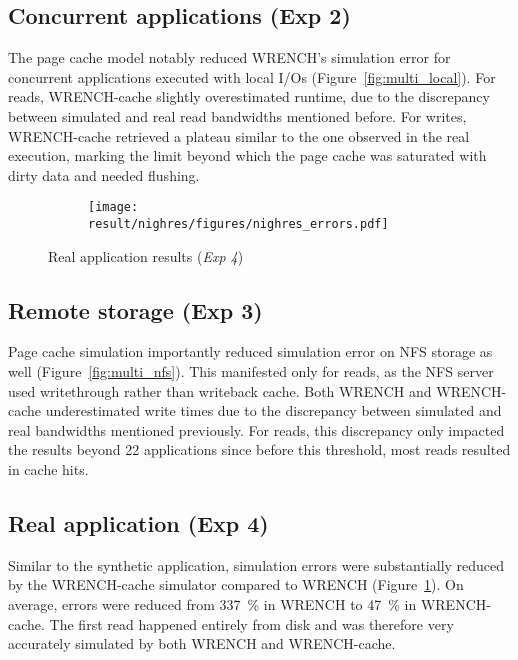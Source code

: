 \documentclass[conference]{IEEEtran}
\newcommand{\wrench}{WRENCH\xspace}
\begin{document}
        \subsection{Concurrent applications (Exp 2)}

            The page cache model notably reduced \wrench's simulation error
            for concurrent applications executed with local I/Os
            (Figure~\ref{fig:multi_local}). For reads, \wrench-cache
            slightly overestimated runtime, due to the discrepancy between
            simulated and real read bandwidths mentioned before. 
            For writes, \wrench-cache
            retrieved a plateau similar to the one observed in the real
            execution, marking the limit beyond which the page cache was
            saturated with dirty data and needed flushing.

            \begin{figure}[b]
                \begin{subfigure}{0.95\linewidth}
                    \centering
                    \texttt{[image: result/nighres/figures/nighres\_errors.pdf]}
                \end{subfigure}
                \caption{Real application results (\textit{Exp 4})}
                \label{fig:nighres}
                \end{figure}
        \subsection{Remote storage (Exp 3)}

            Page cache simulation importantly reduced simulation error
            on NFS storage as well (Figure~\ref{fig:multi_nfs}). This
            manifested only for reads, as the NFS server used writethrough rather than writeback cache.
            Both \wrench and \wrench-cache
            underestimated write times due to the discrepancy between
            simulated and real bandwidths mentioned previously. For reads,
            this discrepancy only impacted the results beyond 22
            applications since before this threshold, most reads resulted in cache
            hits.


        \subsection{Real application (Exp 4)}
        Similar to the synthetic application, simulation errors were
        substantially reduced by the WRENCH-cache simulator compared to
        WRENCH (Figure~\ref{fig:nighres}). On average, errors were reduced
        from 337~\% in WRENCH to 47~\% in WRENCH-cache. 
        The first read happened entirely from disk and was therefore 
        very accurately simulated by both WRENCH and WRENCH-cache.
\end{document}
